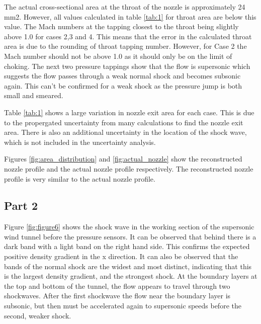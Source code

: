 \documentclass{article}
\begin{document}

The actual cross-sectional area at the throat of the nozzle is approximately 24 mm2.
However, all values calculated in table \ref{tab:1} for throat area are below this value.
The Mach numbers at the tapping closest to the throat being slightly above 1.0 for cases 2,3 and 4.
This means that the error in the calculated throat area is due to the rounding of throat tapping number.
However, for Case 2 the Mach number should not be above 1.0 as it should only be on the limit of choking.
The next two pressure tappings show that the flow is supersonic which suggests the flow passes through a weak normal shock and becomes subsonic again.
This can't be confirmed for a weak shock as the pressure jump is both small and smeared.

Table \ref{tab:1} shows a large variation in nozzle exit area for each case.
This is due to the propergated uncertainty from many calculations to find the nozzle exit area.
There is also an additional uncertainty in the location of the shock wave, which is not included in the uncertainty analysis.

Figures \ref{fig:area_distribution} and \ref{fig:actual_nozzle} show the reconstructed nozzle profile and the actual nozzle profile respectively.
The reconstructed nozzle profile is very similar to the actual nozzle profile.



\subsection{Part 2}

Figure \ref{fig:figure6} shows the shock wave in the working section of the supersonic wind tunnel before the pressure sensors.
It can be observed that behind there is a dark band with a light band on the right hand side.
This confirms the expected positive density gradient in the x direction.
It can also be observed that the bands of the normal shock are the widest and most distinct, indicating that this is the largest density gradient, and the strongest shock.
At the boundary layers at the top and bottom of the tunnel, the flow appears to travel through two shockwaves.
After the first shockwave the flow near the boundary layer is subsonic, but then must be accelerated again to supersonic speeds before the second, weaker shock.
\end{document}
